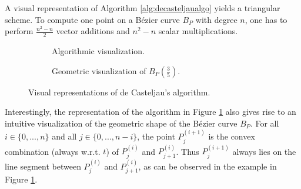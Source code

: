 \documentclass[a4paper, 11pt]{report}
\theoremstyle{definition}
\begin{document}
	A visual representation of Algorithm \ref{alg:decasteljaualgo} yields a triangular scheme. To compute one point on a Bézier curve $B_P$ with degree $n$, one has to perform $\frac{n^2-n}{2}$ vector additions and $n^2-n$ scalar multiplications.

	\begin{figure}[H]
		\centering
		\begin{subfigure}{0.49\textwidth}
			\caption{Algorithmic visualization.}
		\end{subfigure}
		\hfill
		\begin{subfigure}{0.49\textwidth}
			
			\caption{Geometric visualization of $B_P(\frac{3}{5})$.}
		\end{subfigure}
		\caption{Visual representations of de Casteljau's algorithm.}
		\label{fig:decasteljautriangle}
	\end{figure}

	Interestingly, the representation of the algorithm in Figure \ref{fig:decasteljautriangle} also gives rise to an intuitive visualization of the geometric shape of the Bézier curve $B_P$. For all $i \in \{0, ..., n\}$ and all $j \in \{0, ..., n-i\}$, the point $P^{(i+1)}_j$ is the convex combination (always w.r.t. $t$) of $P^{(i)}_j$ and $P^{(i)}_{j+1}$. Thus $P^{(i+1)}_j$ always lies on the line segment between $P^{(i)}_j$ and $P^{(i)}_{j+1}$, as can be observed in the example in Figure \ref{fig:decasteljautriangle}.
\end{document}
